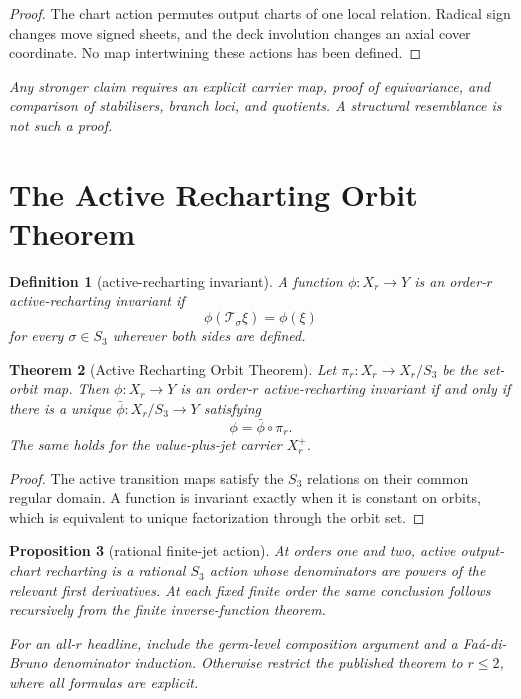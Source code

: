 \documentclass[11pt]{article}
\newtheorem{theorem}{Theorem}[section]
\newtheorem{proposition}[theorem]{Proposition}
\newtheorem{definition}[theorem]{Definition}
\theoremstyle{remark}
\newcommand{\proofstop}[1]{\par\medskip\noindent{\color{red!75!black}\textbf{STOP--PROOF.}} \textit{#1}\par\medskip}
\begin{document}
\begin{proof}
The chart action permutes output charts of one local relation. Radical sign
changes move signed sheets, and the deck involution changes an axial cover
coordinate. No map intertwining these actions has been defined.
\end{proof}

\proofstop{Any stronger claim requires an explicit carrier map, proof of
equivariance, and comparison of stabilisers, branch loci, and quotients. A
structural resemblance is not such a proof.}

\section{The Active Recharting Orbit Theorem}

\begin{definition}[active-recharting invariant]
A function $\phi:X_r\to Y$ is an order-$r$ active-recharting invariant if
\[
\phi(\mathcal T_\sigma\xi)=\phi(\xi)
\]
for every $\sigma\in S_3$ wherever both sides are defined.
\end{definition}

\begin{theorem}[Active Recharting Orbit Theorem]\label{thm:orbit}
Let $\pi_r:X_r\to X_r/S_3$ be the set-orbit map. Then
$\phi:X_r\to Y$ is an order-$r$ active-recharting invariant if and only if
there is a unique $\bar\phi:X_r/S_3\to Y$ satisfying
\[
\phi=\bar\phi\circ\pi_r.
\]
The same holds for the value-plus-jet carrier $X_r^+$.
\end{theorem}

\begin{proof}
The active transition maps satisfy the $S_3$ relations on their common
regular domain. A function is invariant exactly when it is constant on
orbits, which is equivalent to unique factorization through the orbit set.
\end{proof}

\begin{proposition}[rational finite-jet action]\label{prop:rationalaction}
At orders one and two, active output-chart recharting is a rational $S_3$
action whose
denominators are powers of the relevant first derivatives. At each fixed
finite order the same conclusion follows recursively from the finite
inverse-function theorem.
\end{proposition}

\proofstop{For an all-$r$ headline, include the germ-level composition
argument and a Fa\'{a}-di-Bruno denominator induction. Otherwise restrict
the published theorem to $r\leq2$, where all formulas are explicit.}
\end{document}
